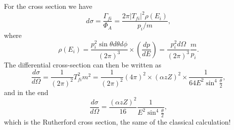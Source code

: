 For the cross section we have
\begin{equation*}
    d\sigma = \frac{\Gamma_{fi}}{\Phi_A} = \frac{2\pi|T_{fi}|^2\rho(E_i)}{p_i/m},
\end{equation*}
where 
\begin{equation*}
    \rho(E_i) = \frac{p_i^2\sin{\theta}d\theta d\phi}{(2\pi)^3}\times\left(\frac{dp}{dE}\right) = \frac{p_i^2d\Omega}{(2\pi)^3}\frac{m}{p_i}.
\end{equation*}
The differential cross-section can then be written as
\begin{equation*}
    \frac{d\sigma}{d\Omega} = \frac{1}{(2\pi)^2}T_{fi}^2m^2 = \frac{1}{(2\pi)^2}(4\pi)^2\times(\alpha zZ)^2\times\frac{1}{64E^2\sin^4\frac{\theta}{2}},
\end{equation*}
and in the end
\begin{equation*}
    \frac{d\sigma}{d\Omega} = \frac{(\alpha zZ)^2}{16}\frac{1}{E^2\sin^4\frac{\theta}{2}},
\end{equation*}
which is the Rutherford cross section, the same of the classical calculation!

